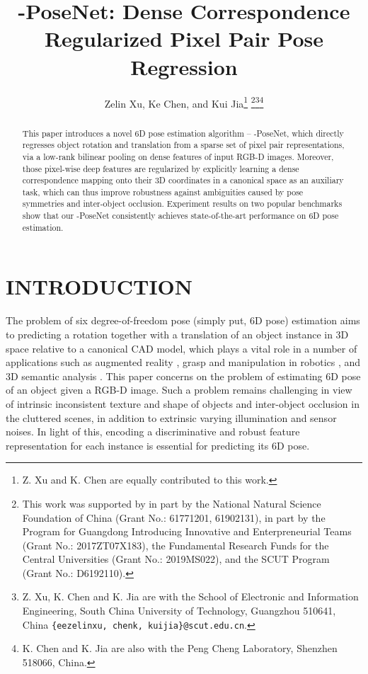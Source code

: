 \documentclass[letterpaper, 10 pt, conference]{ieeeconf}
\title{\LARGE \bf
-PoseNet: Dense Correspondence Regularized Pixel Pair Pose Regression
}
\author{Zelin Xu, Ke Chen, and Kui Jia\thanks{Z. Xu and K. Chen are equally contributed to this work.}
\thanks{This work was supported by in part by the National Natural Science Foundation of China (Grant No.: 61771201, 61902131), in part by the Program for Guangdong Introducing Innovative and Enterpreneurial Teams
(Grant No.: 2017ZT07X183), the Fundamental Research Funds for the Central Universities (Grant No.: 2019MS022), and the SCUT Program (Grant No.: D6192110).}\thanks{Z. Xu, K. Chen and K. Jia are with the School of Electronic and
Information Engineering, South China University of Technology, Guangzhou
510641, China {\tt\small \{eezelinxu, chenk, kuijia\}@scut.edu.cn}.}\thanks{ K. Chen and K. Jia are also with the Peng Cheng Laboratory, Shenzhen 518066, China. }
}
\begin{document}
\maketitle
\thispagestyle{empty}
\pagestyle{empty}


\begin{abstract}
This paper introduces a novel 6D pose estimation algorithm -- -PoseNet, which directly regresses object rotation and translation from a sparse set of pixel pair representations, via a low-rank bilinear pooling on dense features of input RGB-D images. Moreover, those pixel-wise deep features are regularized by explicitly learning a dense correspondence mapping onto their 3D coordinates in a canonical space as an auxiliary task, which can thus improve robustness against ambiguities caused by pose symmetries and inter-object occlusion. Experiment results on two popular benchmarks show that our -PoseNet consistently achieves state-of-the-art performance on 6D pose estimation. 
\end{abstract}


\section{INTRODUCTION}

The problem of six degree-of-freedom pose (simply put, 6D pose) estimation aims to predicting a rotation together with a translation of an object instance in 3D space relative to a canonical CAD model, which plays a vital role in a number of applications such as augmented reality \cite{marchand2015pose,yu2005pose}, grasp and manipulation in robotics \cite{tremblay2018deep,ten2017grasp,zhu2014single}, and 3D semantic analysis \cite{xu2018pointfusion,tejani2014latent,kehl2016deep,tang2020improving}. 
This paper concerns on the problem of estimating 6D pose of an object given a RGB-D image.
Such a problem remains challenging in view of intrinsic inconsistent texture and shape of objects and inter-object occlusion in the cluttered scenes, in addition to extrinsic varying illumination and sensor noises.
In light of this, encoding a discriminative and robust feature representation for each instance is essential for predicting its 6D pose. 
\end{document}
